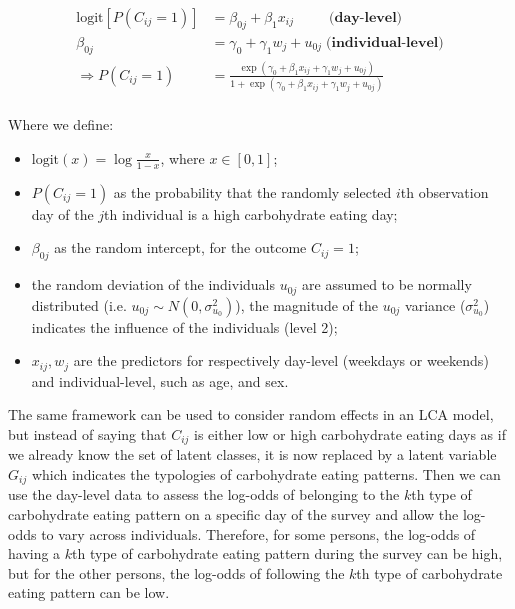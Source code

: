 \begin{equation}
\begin{aligned}
\text{logit}[P(C_{ij} = 1)] & = \beta_{0j} + \beta_{1}x_{ij} \;\;\;\;\;\;\;\;\; \textbf{(day-level)}  \\
\beta_{0j} & = \gamma_0 + \gamma_1 w_j + u_{0j} \; \textbf{(individual-level)} \\ 
\Rightarrow P(C_{ij} = 1) & = \frac{\exp{(\gamma_0 + \beta_{1}x_{ij} + \gamma_1 w_j + u_{0j})}}{1 + \exp{(\gamma_0 + \beta_{1}x_{ij} + \gamma_1 w_j + u_{0j})}} \\
\end{aligned}
\label{randomLCA}
\end{equation}
\vspace{-0.3cm}

Where we define: 

\begin{itemize}
	\item $\text{logit}{(x)} = \log{\frac{x}{1-x}}$, where $x \in [0,1]$;
	\item $P(C_{ij} = 1)$ as the probability that the randomly selected $i$th observation day of the $j$th individual is a high carbohydrate eating day;
	\item $\beta_{0j}$ as the random intercept, for the outcome $C_{ij} = 1$; 
	\item the random deviation of the individuals $u_{0j}$ are assumed to be normally distributed (i.e. $u_{0j} \sim N(0, \sigma_{u_0}^2)$), the magnitude of the $u_{0j}$ variance ($\sigma_{u_0}^2$) indicates the influence of the individuals (level 2);
	\item $x_{ij}, w_j$ are the predictors for respectively day-level (weekdays or weekends) and individual-level, such as age, and sex.
\end{itemize}



The same framework can be used to consider random effects in an LCA model, but instead of saying that $C_{ij}$ is either low or high carbohydrate eating days as if we already know the set of latent classes, it is now replaced by a latent variable $G_{ij}$ which indicates the typologies of carbohydrate eating patterns. Then we can use the day-level data to assess the log-odds of belonging to the $k$th type of carbohydrate eating pattern on a specific day of the survey and allow the log-odds to vary across individuals. Therefore, for some persons, the log-odds of having a $k$th type of carbohydrate eating pattern during the survey can be high, but for the other persons, the log-odds of following the $k$th type of carbohydrate eating pattern can be low. 


